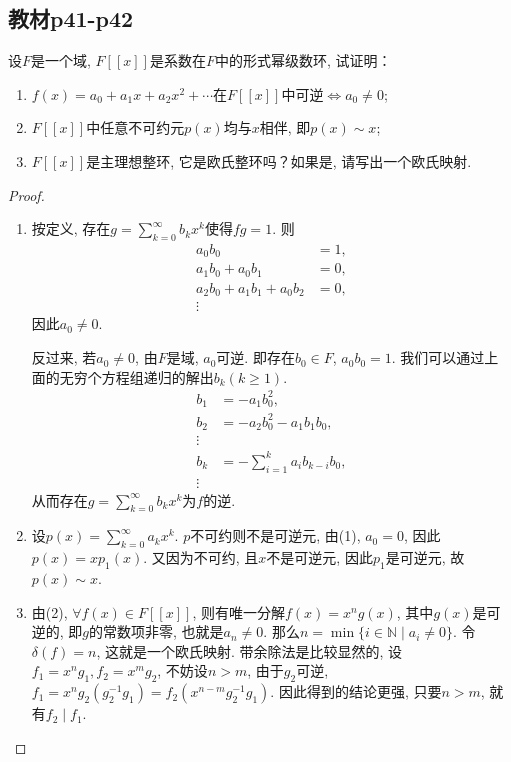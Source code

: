 \subsection{教材p41-p42}

\begin{problem}
    设$F$是一个域, $F[[x]]$是系数在$F$中的形式幂级数环, 试证明：
\begin{enumerate}[(1)]
    \item $f(x) = a_0 + a_1x + a_2x^2 + \cdots$在$F[[x]]$中可逆$\Leftrightarrow a_0 \neq 0$;
    \item $F[[x]]$中任意不可约元$p(x)$均与$x$相伴, 即$p(x) \sim x$;
    \item $F[[x]]$是主理想整环, 它是欧氏整环吗？如果是, 请写出一个欧氏映射.
\end{enumerate}
\end{problem}

\begin{proof}
    \begin{enumerate}[(1)]
        \item 按定义, 存在$g = \sum_{k = 0}^{\infty} b_kx^k$使得$fg = 1$. 则
        \[
        \begin{aligned}
            a_0b_0 &= 1,\\
            a_1b_0 + a_0b_1 &= 0,\\
            a_2b_0 + a_1b_1 + a_0b_2 &= 0,\\
            \vdots
        \end{aligned}
        \]
        因此$a_0 \neq 0$.
        
        反过来, 若$a_0 \neq 0$, 由$F$是域, $a_0$可逆. 即存在$b_0 \in F$, $a_0b_0 = 1$. 我们可以通过上面的无穷个方程组递归的解出$b_k(k \geqslant 1)$.
        \[
        \begin{aligned}
            b_1 &= -a_1b_0^2,\\
            b_2 &= -a_2b_0^2 - a_1b_1b_0,\\
            \vdots\\
            b_k &= -\sum_{i = 1}^{k} a_ib_{k - i}b_0,\\
            \vdots
        \end{aligned}
        \]
        从而存在$g = \sum_{k = 0}^{\infty} b_kx^k$为$f$的逆.
        \item 设$p(x) = \sum_{k = 0}^{\infty} a_kx^k$. $p$不可约则不是可逆元, 由(1), $a_0 = 0$, 因此$p(x) = xp_1(x)$. 又因为不可约, 且$x$不是可逆元, 因此$p_1$是可逆元, 故$p(x) \sim x$.
        \item 由(2), $\forall f(x) \in F[[x]]$, 则有唯一分解$f(x) = x^ng(x)$, 其中$g(x)$是可逆的, 即$g$的常数项非零, 也就是$a_n \neq 0$. 那么$n = \min \{i \in \mathbb{N} \mid a_i \neq 0\}$. 令$\delta(f) = n$, 这就是一个欧氏映射. 带余除法是比较显然的, 设$f_1 = x^ng_1, f_2 = x^mg_2$, 不妨设$n > m$, 由于$g_2$可逆, $f_1 = x^ng_2(g_2^{-1}g_1) = f_2(x^{n - m}g_2^{-1}g_1)$. 因此得到的结论更强, 只要$n > m$, 就有$f_2 \mid f_1$.
    \end{enumerate}
\end{proof}

